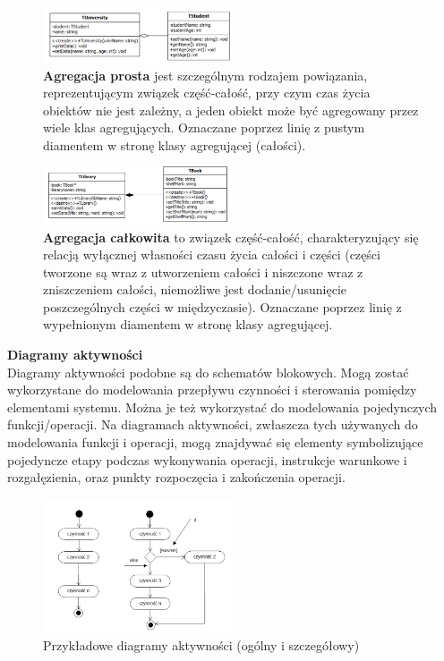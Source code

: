 \documentclass[a4paper,12pt,oneside]{book}
\begin{document}
                \begin{figure}[H]
                    \centering
                    \includegraphics[width=0.5\textwidth]{images/class_agg_prosta.jpg}
                    \caption{\textbf{Agregacja prosta} jest szczególnym rodzajem powiązania, reprezentującym związek część-całość, przy czym czas życia obiektów nie jest zależny, a jeden obiekt może być agregowany przez wiele klas agregujących. Oznaczane poprzez linię z pustym diamentem w stronę klasy agregującej (całości).}
                    \label{fig:twojastara38}
                \end{figure}
                \begin{figure}[H]
                    \centering
                    \includegraphics[width=0.5\textwidth]{images/class_agg_calkowita.jpg}
                    \caption{\textbf{Agregacja całkowita} to związek część-całość, charakteryzujący się relacją wyłącznej własności czasu życia całości i części (części tworzone są wraz z utworzeniem całości i niszczone wraz z zniszczeniem całości, niemożliwe jest dodanie/usunięcie poszczególnych części w międzyczasie). Oznaczane poprzez linię z wypełnionym diamentem w stronę klasy agregującej.}
                    \label{fig:twojastara39}
                \end{figure}
				\textbf{Diagramy aktywności}\\
                Diagramy aktywności podobne są do schematów blokowych. Mogą zostać wykorzystane do modelowania przepływu czynności i sterowania pomiędzy elementami systemu. Można je też wykorzystać do modelowania pojedynczych funkcji/operacji. Na diagramach aktywności, zwłaszcza tych używanych do modelowania funkcji i operacji, mogą znajdywać się elementy symbolizujące pojedyncze etapy podczas wykonywania operacji, instrukcje warunkowe i rozgałęzienia, oraz punkty rozpoczęcia i zakończenia operacji.\\
                \begin{figure}[h]
                    \centering
                    \includegraphics[width=0.5\textwidth]{images/d_activity.jpg}
                    \caption{Przykładowe diagramy aktywności (ogólny i szczegółowy)}
                    \label{fig:twojastara40}
                \end{figure}
\end{document}
